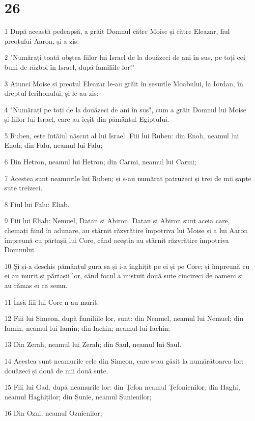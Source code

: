 \chapter{26}

\par 1 După această pedeapsă, a grăit Domnul către Moise și către Eleazar, fiul preotului Aaron, și a zis:
\par 2 "Numărați toată obștea fiilor lui Israel de la douăzeci de ani în sus, pe toți cei buni de război în Israel, după familiile lor!"
\par 3 Atunci Moise și preotul Eleazar le-au grăit în șesurile Moabului, la Iordan, în dreptul Ierihonului, și le-au zis:
\par 4 "Numărați pe toți de la douăzeci de ani în sus", cum a grăit Domnul lui Moise și fiilor lui Israel, care au ieșit din pământul Egiptului.
\par 5 Ruben, este întâiul născut al lui Israel. Fiii lui Ruben: din Enoh, neamul lui Enoh; din Falu, neamul lui Falu;
\par 6 Din Hețron, neamul lui Hețron; din Carmi, neamul lui Carmi;
\par 7 Acestea sunt neamurile lui Ruben; și s-au numărat patruzeci și trei de mii șapte sute treizeci.
\par 8 Fiul lui Falu: Eliab.
\par 9 Fiii lui Eliab: Nemuel, Datan și Abiron. Datan și Abiron sunt aceia care, chemați fiind în adunare, au stârnit răzvrătire împotriva lui Moise și a lui Aaron împreună cu părtașii lui Core, când aceștia au stârnit răzvrătire împotriva Domnului
\par 10 Și și-a deschis pământul gura sa și i-a înghițit pe ei și pe Core; și împreună cu ei au murit și părtașii lor, când focul a mistuit două sute cincizeci de oameni și au rămas ei ca semn.
\par 11 Însă fiii lui Core n-au murit.
\par 12 Fiii lui Simeon, după familiile lor, sunt: din Nemuel, neamul lui Nemuel; din Iamin, neamul lui Iamin; din Iachin; neamul lui Iachin;
\par 13 Din Zerah, neamul lui Zerah; din Saul, neamul lui Saul.
\par 14 Acestea sunt neamurile cele din Simeon, care s-au găsit la numărătoarea lor: douăzeci și două de mii două sute.
\par 15 Fiii lui Gad, după neamurile lor: din Țefon neamul Țefonienilor; din Haghi, neamul Haghiților; din Șunie, neamul Șunienilor;
\par 16 Din Ozni, neamul Oznienilor;
